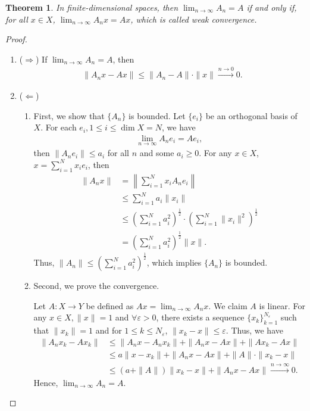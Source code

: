 \documentclass[11pt]{book}
\newtheorem{theorem}{Theorem}[section]
\theoremstyle{definition}
\numberwithin{equation}{chapter}
\begin{document}
\begin{theorem}
In finite-dimensional spaces, then $\lim_{n\to\infty}A_n = A$ if and only if, for all $x\in X$, $\lim_{n\to\infty} A_n x = Ax$, which is called weak convergence.
\end{theorem}
\begin{proof}
~\begin{enumerate}[label=(\arabic*)]
    \item ($\Rightarrow$) If $\lim_{n\to\infty}A_n = A$, then 
    \begin{align*}
        \|A_n x - Ax\| \leq \|A_n - A\|\cdot \|x\| \xrightarrow{n \to 0} 0.
    \end{align*}
    \item ($\Leftarrow$) 
    \begin{enumerate}[label=(\alph*)]
        \item First, we show that $\{A_n\}$ is bounded. Let $\{e_i\}$ be an orthogonal basis of $X$. For each $e_i, 1\leq i\leq \dim X = N$, we have
        \begin{align*}
            \lim_{n\to\infty} A_n e_i = A e_i,
        \end{align*}
        then $\|A_n e_i\| \leq a_i$ for all $n$ and some $a_i \geq 0$. For any $x\in X$, $x = \sum^N_{i=1}x_i e_i$, then
        \begin{align*}
            \|A_n x\| & = \left\|\sum^N_{i=1}x_i A_n e_i\right\| \\
            & \leq \sum^N_{i=1}a_i \|x_i\| \\
            & \leq \left(\sum^N_{i=1}a_i^2\right)^{\frac{1}{2}} \cdot \left(\sum^N_{i=1}\|x_i\|^2\right)^{\frac{1}{2}} \\
            &  = \left(\sum^N_{i=1}a_i^2\right)^{\frac{1}{2}} \|x\|.
        \end{align*}
        Thus, $\|A_n\| \leq \left(\sum^N_{i=1}a_i^2\right)^{\frac{1}{2}}$, which implies $\{A_n\}$ is bounded.
        \item Second, we prove the convergence.
        
        Let $A:X\to Y$ be defined as $Ax = \lim_{n\to\infty}A_n x$. We claim $A$ is linear. For any $x\in X, \|x\| = 1$ and $\forall \varepsilon > 0$, there exists a sequence $\{x_k\}^{N_\varepsilon}_{k=1}$ such that $\|x_k\| = 1$ and for $1\leq k \leq N_\varepsilon$, $\|x_k - x\| \leq \varepsilon$. Thus, we have
        \begin{align*}
            \|A_n x_k  - Ax_k\| & \leq \|A_n x - A_n x_k\| + \|A_n x - A x\| + \|Ax_k - Ax\| \\
            & \leq a\|x - x_k\| + \|A_n x - A x\| + \|A\|\cdot \|x_k - x\| \\
            & \leq (a + \|A\|)\|x_k - x\| + \|A_n x - A x\| \xrightarrow{n\to\infty} 0. 
        \end{align*}
        Hence, $\lim_{n\to\infty}A_n = A$.
    \end{enumerate}
\end{enumerate}
\end{proof}
\end{document}

